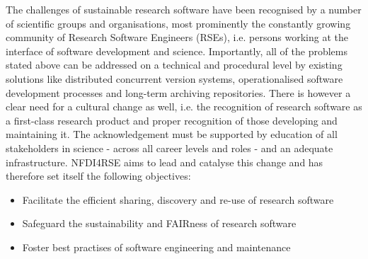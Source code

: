 \documentclass[11pt,a4paper]{scrlttr2}
\begin{document}
\begin{letter}{}
The challenges of sustainable research software have been recognised by a number of scientific groups and organisations, most prominently the constantly growing community of Research Software Engineers (RSEs), i.e. persons working at the interface of software development and science. Importantly, all of the problems stated above can be addressed on a technical and procedural level by existing solutions like distributed concurrent version systems, operationalised software development processes and long-term archiving repositories. There is however a clear need for a cultural change as well, i.e. the recognition of research software as a first-class research product and proper recognition of those developing and maintaining it. The acknowledgement must be supported by education of all stakeholders in science - across all career levels and roles - and an adequate infrastructure. NFDI4RSE aims to lead and catalyse this change and has therefore set itself the following objectives:
\begin{itemize}
 \item Facilitate the efficient sharing, discovery and re-use of research software
 \item Safeguard the sustainability and FAIRness of research software
 \item Foster best practises of software engineering and maintenance
\end{itemize}


\end{letter}
\end{document}
